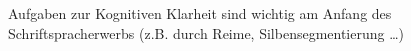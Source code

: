 Aufgaben zur Kognitiven Klarheit sind wichtig am Anfang des Schriftspracherwerbs (z.B. durch Reime, Silbensegmentierung …)